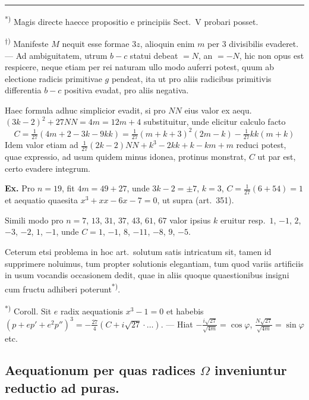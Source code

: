 \documentclass[12pt,a4paper]{article}
\theoremstyle{plain}
\theoremstyle{definition}
\theoremstyle{remark}
\begin{document}
\vspace{0.5em}
\noindent\rule{4cm}{0.4pt}

\noindent\textsuperscript{*)} Magis directe haecce propositio e principiis Sect.\ V probari posset.

\vspace{0.3em}
\noindent\textsuperscript{$\dagger$)} Manifeste $M$ nequit esse formae $3z$, alioquin enim $m$ per $3$ divisibilis evaderet. --- Ad ambiguitatem, utrum $b - c$ statui debeat $= N$, an $= -N$, hic non opus est respicere, neque etiam per rei naturam ullo modo auferri potest, quum ab electione radicis primitivae $g$ pendeat, ita ut pro aliis radicibus primitivis differentia $b - c$ positiva evadat, pro aliis negativa.

\vspace{0.5em}
Haec formula adhuc simplicior evadit, si pro $NN$ eius valor ex aequ.\ $(3k-2)^2 + 27NN = 4m = 12m + 4$ substituitur, unde elicitur calculo facto
\[C = \tfrac{1}{27}(4m + 2 - 3k - 9kk) = \tfrac{1}{27}(m + k + 3)^2(2m - k) - \tfrac{1}{27}kk(m + k)\]
Idem valor etiam ad $\tfrac{1}{27}(2k - 2)NN + k^3 - 2kk + k - km + m$ reduci potest, quae expressio, ad usum quidem minus idonea, protinus monstrat, $C$ ut par est, certo evadere integrum.

\textbf{Ex.} Pro $n = 19$, fit $4m = 49 + 27$, unde $3k - 2 = \pm 7$, $k = 3$, $C = \tfrac{1}{27}(6 + 54) = 1$ et aequatio quaesita $x^3 + xx - 6x - 7 = 0$, ut supra (art.\ 351).

Simili modo pro $n = 7$, $13$, $31$, $37$, $43$, $61$, $67$ valor ipsius $k$ eruitur resp.\ $1$, $-1$, $2$, $-3$, $-2$, $1$, $-1$, unde $C = 1$, $-1$, $8$, $-11$, $-8$, $9$, $-5$.

Ceterum etsi problema in hoc art.\ solutum satis intricatum sit, tamen id supprimere noluimus, tum propter solutionis elegantiam, tum quod variis artificiis in usum vocandis occasionem dedit, quae in aliis quoque quaestionibus insigni cum fructu adhiberi poterunt\textsuperscript{*)}.

\vspace{0.5em}
\noindent\textsuperscript{*)} Coroll. Sit $e$ radix aequationis $x^3 - 1 = 0$ et habebis $(p + ep' + e^2p'')^3 = -\tfrac{27}{4}(C + i\sqrt{27} \cdot \ldots)$. --- Hiat $-\tfrac{i\sqrt{27}}{\sqrt{4m}} = \cos\varphi$, $\tfrac{N\sqrt{27}}{\sqrt{4m}} = \sin\varphi$ etc.


\subsection*{Aequationum per quas radices $\Omega$ inveniuntur reductio ad puras.}
\end{document}
